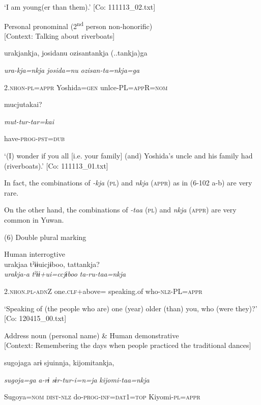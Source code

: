 \glt ‘I am young(er than them).’ [Co: 111113\_02.txt]
\z

 \ex Personal pronominal (2\textsuperscript{nd} person non-honorific)\\{}
[Context: Talking about riverboats]

{\TM}
\gll urakjankja,  josidanu  ozisantankja (..tankja)ga

      \textit{ura-kja=nkja}  \textit{josida=nu}  \textit{ozisan-ta=nkja=ga}

      2.\textsc{nhon}-\textsc{pl}=\textsc{appr}  Yoshida=\textsc{gen}  unlce-PL=\textsc{app}R=\textsc{nom}

      mucjutakai?

      \textit{mut-tur-tar=kai}

      have-\textsc{prog}-\textsc{pst}=\textsc{dub}

\glt ‘(I) wonder if you all [i.e. your family] (and) Yoshida’s uncle and his family had (riverboats).’ [Co: 111113\_01.txt]
\z

In fact, the combinations of \textit{{}-kja} (\textsc{pl}) and \textit{nkja} (\textsc{appr}) as in (6-102 a-b) are very rare.

On the other hand, the combinations of \textit{{}-taa} (\textsc{pl}) and \textit{nkja} (\textsc{appr}) are very common in Yuwan.

(6)  Double plural marking

 \ea Human interrogtive\\
{\TM}
\gll  urakjaa  tˀɨɨuicjɨboo,  tattankja?\\

      \textit{urakja-a}  \textit{tˀɨɨ+ui=ccjɨboo}  \textit{ta-ru-taa=nkja}

      2.\textsc{nhon}.\textsc{pl}-\textsc{adn}Z  one.\textsc{clf}+above= speaking.of  who-\textsc{nlz}-PL=\textsc{appr}

\glt ‘Speaking of (the people who are) one (year) older (than) you, who (were they)?’ [Co: 120415\_00.txt]
\z

 \ex Address noun (personal name) \& Human demonstrative\\{}
[Context: Remembering the days when people practiced the traditional dances]

{\TM}
\gll sugojaga  arɨ  sjuinnja,  kijomitankja,

      \textit{sugoja=ga}  \textit{a-rɨ}  \textit{sɨr-tur-i=n=ja}  \textit{kijomi-taa=nkja}

      Sugoya=\textsc{nom}  \textsc{dist}-\textsc{nlz}  do-\textsc{prog}-\textsc{inf}=\textsc{dat}1=\textsc{top}  Kiyomi-\textsc{pl}=\textsc{appr}


